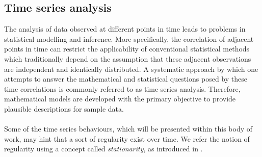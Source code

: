\subsection{Time series analysis}

The analysis of data observed at different points in time leads to problems in statistical modelling and inference. 
More specifically, the correlation of adjacent points in time can restrict the applicability of conventional statistical methods which traditionally depend on the assumption that these adjacent observations are independent and identically distributed. 
A systematic approach by which one attempts to answer the mathematical and statistical questions posed by these time correlations is commonly referred to as time series analysis. 
Therefore, mathematical models are developed with the primary objective to provide plausible descriptions for sample data. \cite{shumway2000time}
%
%
%
%
\\
\\
Some of the time series behaviours, which will be presented within this body of work, may hint that a sort of regularity exist over time.
We refer the notion of regularity using a concept called \textit{stationarity}, as introduced in \cite{shumway2000time}.
